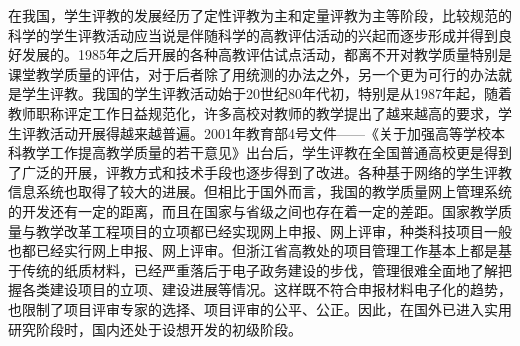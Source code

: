 在我国，学生评教的发展经历了定性评教为主和定量评教为主等阶段，比较规范的科学的学生评教活动应当说是伴随科学的高教评估活动的兴起而逐步形成并得到良好发展的。1985年之后开展的各种高教评估试点活动，都离不开对教学质量特别是课堂教学质量的评估，对于后者除了用统测的办法之外，另一个更为可行的办法就是学生评教。我国的学生评教活动始于20世纪80年代初，特别是从1987年起，随着教师职称评定工作日益规范化，许多高校对教师的教学提出了越来越高的要求，学生评教活动开展得越来越普遍。2001年教育部4号文件——《关于加强高等学校本科教学工作提高教学质量的若干意见》出台后，学生评教在全国普通高校更是得到了广泛的开展，评教方式和技术手段也逐步得到了改进。各种基于网络的学生评教信息系统也取得了较大的进展。但相比于国外而言，我国的教学质量网上管理系统的开发还有一定的距离，而且在国家与省级之间也存在着一定的差距。国家教学质量与教学改革工程项目的立项都已经实现网上申报、网上评审，种类科技项目一般也都已经实行网上申报、网上评审。但浙江省高教处的项目管理工作基本上都是基于传统的纸质材料，已经严重落后于电子政务建设的步伐，管理很难全面地了解把握各类建设项目的立项、建设进展等情况。这样既不符合申报材料电子化的趋势，也限制了项目评审专家的选择、项目评审的公平、公正。因此，在国外已进入实用研究阶段时，国内还处于设想开发的初级阶段。
